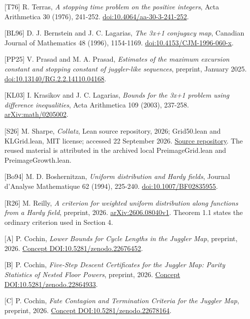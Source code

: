 \documentclass[11pt,a4paper]{article}
\begin{document}
\begingroup\small

{[}T76{]} R. Terras, \emph{A stopping time problem on the positive
integers}, Acta Arithmetica 30 (1976), 241-252.
\href{https://doi.org/10.4064/aa-30-3-241-252}{doi:10.4064/aa-30-3-241-252}.

{[}BL96{]} D. J. Bernstein and J. C. Lagarias, \emph{The 3x+1 conjugacy
map}, Canadian Journal of Mathematics 48 (1996), 1154-1169.
\href{https://doi.org/10.4153/CJM-1996-060-x}{doi:10.4153/CJM-1996-060-x}.

{[}PP25{]} V. Prasad and M. A. Prasad, \emph{Estimates of the maximum
excursion constant and stopping constant of juggler-like sequences},
preprint, January 2025.
\href{https://doi.org/10.13140/RG.2.2.14110.04168}{doi:10.13140/RG.2.2.14110.04168}.

{[}KL03{]} I. Krasikov and J. C. Lagarias, \emph{Bounds for the 3x+1
problem using difference inequalities}, Acta Arithmetica 109 (2003),
237-258. \href{https://arxiv.org/abs/math/0205002}{arXiv:math/0205002}.

{[}S26{]} M. Sharpe, \emph{Collatz}, Lean source repository, 2026;
Grid50.lean and KLGrid.lean, MIT license; accessed 22 September 2026.
\href{https://github.com/msharpe248/collatz}{Source repository}. The
reused material is attributed in the archived local PreimageGrid.lean
and PreimageGrowth.lean.

{[}Bo94{]} M. D. Boshernitzan, \emph{Uniform distribution and Hardy
fields}, Journal d'Analyse Mathematique 62 (1994), 225-240.
\href{https://doi.org/10.1007/BF02835955}{doi:10.1007/BF02835955}.

{[}R26{]} M. Reilly, \emph{A criterion for weighted uniform distribution
along functions from a Hardy field}, preprint, 2026.
\href{https://arxiv.org/abs/2606.08040v1}{arXiv:2606.08040v1}. Theorem
1.1 states the ordinary criterion used in Section 4.

{[}A{]} P. Cochin, \emph{Lower Bounds for Cycle Lengths in the Juggler
Map}, preprint, 2026.
\href{https://doi.org/10.5281/zenodo.22676452}{Concept
DOI:10.5281/zenodo.22676452}.

{[}B{]} P. Cochin, \emph{Five-Step Descent Certificates for the Juggler
Map: Parity Statistics of Nested Floor Powers}, preprint, 2026.
\href{https://doi.org/10.5281/zenodo.22864933}{Concept
DOI:10.5281/zenodo.22864933}.

{[}C{]} P. Cochin, \emph{Fate Contagion and Termination Criteria for the
Juggler Map}, preprint, 2026.
\href{https://doi.org/10.5281/zenodo.22678164}{Concept
DOI:10.5281/zenodo.22678164}.
\end{document}
